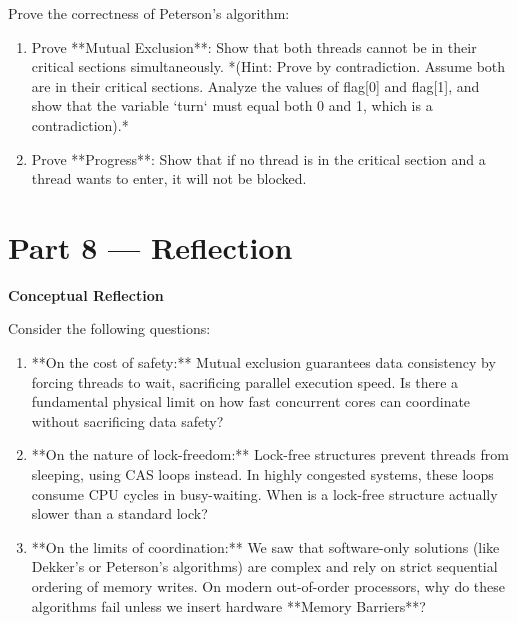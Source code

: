 \documentclass[12pt, a4paper]{book}
\begin{document}
\begin{deepbox}
\begin{enumerate}[label=\textbf{D\arabic*.}]
        Prove the correctness of Peterson's algorithm:
        \begin{enumerate}[label=(\alph*)]
          \item Prove **Mutual Exclusion**: Show that both threads cannot be in their critical sections simultaneously.
                *(Hint: Prove by contradiction. Assume both are in their critical sections. Analyze the values of flag[0] and flag[1], and show that the variable `turn` must equal both 0 and 1, which is a contradiction).*
          \item Prove **Progress**: Show that if no thread is in the critical section and a thread wants to enter, it will not be blocked.
        \end{enumerate}
\end{enumerate}
\end{deepbox}

\newpage

\section{Part 8 --- Reflection}

\begin{reflectionbox}
\textbf{Conceptual Reflection}

Consider the following questions:
\begin{enumerate}
  \item **On the cost of safety:** Mutual exclusion guarantees data consistency by forcing threads to wait, sacrificing parallel execution speed. Is there a fundamental physical limit on how fast concurrent cores can coordinate without sacrificing data safety?
  \item **On the nature of lock-freedom:** Lock-free structures prevent threads from sleeping, using CAS loops instead. In highly congested systems, these loops consume CPU cycles in busy-waiting. When is a lock-free structure actually slower than a standard lock?
  \item **On the limits of coordination:** We saw that software-only solutions (like Dekker's or Peterson's algorithms) are complex and rely on strict sequential ordering of memory writes. On modern out-of-order processors, why do these algorithms fail unless we insert hardware **Memory Barriers**?
\end{enumerate}
\end{reflectionbox}
\end{document}
